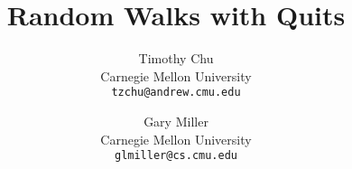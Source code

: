 


\title{Random Walks with Quits}
\author{
  Timothy Chu \\
  Carnegie Mellon University\\
  \texttt{tzchu@andrew.cmu.edu}
  \and
  Gary Miller\\
  Carnegie Mellon University\\
  \texttt{glmiller@cs.cmu.edu} \\
}

\setcounter{page}{0}
\maketitle
\thispagestyle{empty}
\begin{abstract}

\end{abstract}

\clearpage


\begin{appendix}
\end{appendix}

